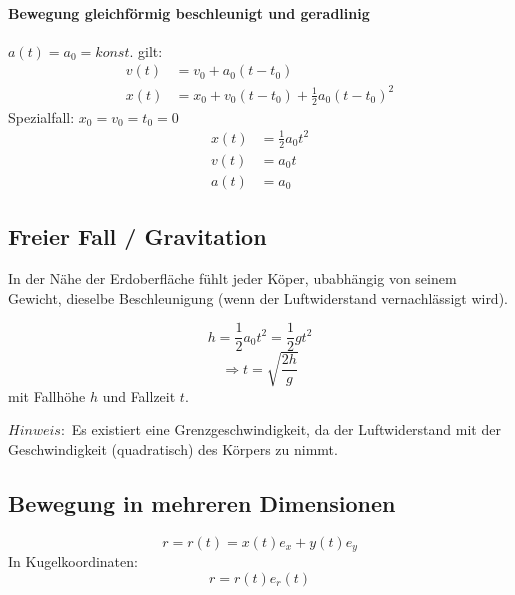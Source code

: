 \documentclass[7pt]{article}
\begin{document}
\begin{multicols}{3}
\paragraph{Bewegung gleichf{\"o}rmig beschleunigt und geradlinig}\mbox{} 
$a(t) = a_0 = konst.$ gilt: \newline
\begin{equation*}
\begin{split}
		v(t)& = v_0 + a_0(t - t_0)\\
	x(t)& = x_0 + v_0(t - t_0) + \frac{1}{2}a_0(t - t_0)^2
\end{split}
\end{equation*}
\newline
Spezialfall: $x_0 = v_0 = t_0 = 0$ \newline
\begin{equation*}
\begin{split}
	x(t)& = \frac{1}{2}a_0t^2 \\
	v(t)& = a_0t \\
	a(t)& = a_0
\end{split}
\end{equation*}

\subsection{Freier Fall / Gravitation}
In der N{\"a}he der Erdoberfl{\"a}che f{\"u}hlt jeder K{\"o}per, ubabh{\"a}ngig von seinem Gewicht, dieselbe Beschleunigung (wenn der Luftwiderstand vernachl{\"a}ssigt wird).

\begin{equation*}
	h = \frac{1}{2}a_0t^2 = \frac{1}{2}gt^2
\end{equation*}
\begin{equation*}
\Rightarrow t = \sqrt{\frac{2h}{g}}
\end{equation*}
mit Fallh{\"o}he $h$ und Fallzeit $t$.
\newline

$Hinweis:$ Es existiert eine Grenzgeschwindigkeit, da der Luftwiderstand mit der Geschwindigkeit (quadratisch) des K{\"o}rpers zu nimmt.


\subsection{Bewegung in mehreren Dimensionen}
\begin{equation*}
r = r(t) = x(t) e_x + y(t) e_y
\end{equation*}
In Kugelkoordinaten:
\begin{equation*}
r = r(t)e_r(t)
\end{equation*}


\end{multicols}
\end{document}
